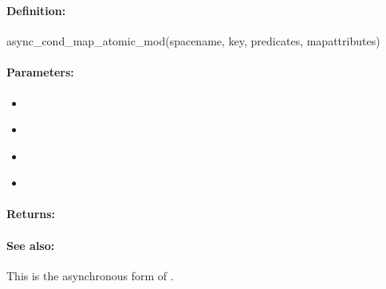 \pagebreak
\subsubsection{}
\label{api:ruby:async_cond_map_atomic_mod}


\paragraph{Definition:}
\begin{rubycode}
async_cond_map_atomic_mod(spacename, key, predicates, mapattributes)
\end{rubycode}

\paragraph{Parameters:}
\begin{itemize}[noitemsep]
\item {}\\

\item {}\\

\item {}\\

\item {}\\

\end{itemize}

\paragraph{Returns:}


\paragraph{See also:}  This is the asynchronous form of .

\pagebreak
\subsubsection{}
\label{api:ruby:map_atomic_and}


